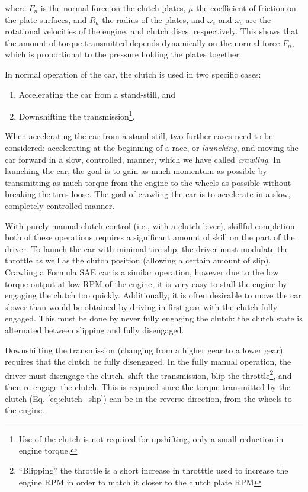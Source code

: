where $F_n$ is the normal force on the clutch plates, $\mu$ the coefficient of friction on the plate surfaces, and $R_a$ the radius of the plates, and $\omega_e$ and $\omega_c$ are the rotational velocities of the engine, and clutch discs, respectively. This shows that the amount of torque transmitted depends dynamically on the normal force $F_n$, which is proportional to the pressure holding the plates together.

In normal operation of the car, the clutch is used in two specific cases:
\begin{enumerate}
  \item Accelerating the car from a stand-still, and
  \item Downshifting the transmission\footnote{Use of the clutch is not required for upshifting, only a small reduction in engine torque.}.
\end{enumerate}

When accelerating the car from a stand-still, two further cases need to be considered: accelerating at the beginning of a race, or \emph{launching}, and moving the car forward in a slow, controlled, manner, which we have called \emph{crawling}. In launching the car, the goal is to gain as much momentum as possible by transmitting as much torque from the engine to the wheels as possible without breaking the tires loose. The goal of crawling the car is to accelerate in a slow, completely controlled manner.

With purely manual clutch control (i.e., with a clutch lever), skillful completion both of these operations requires a significant amount of skill on the part of the driver. To launch the car with minimal tire slip, the driver must modulate the throttle as well as the clutch position (allowing a certain amount of slip). Crawling a Formula SAE car is a similar operation, however due to the low torque output at low RPM of the engine, it is very easy to stall the engine by engaging the clutch too quickly. Additionally, it is often desirable to move the car slower than would be obtained by driving in first gear with the clutch fully engaged. This must be done by never fully engaging the clutch: the clutch state is alternated between slipping and fully disengaged.

Downshifting the transmission (changing from a higher gear to a lower gear) requires that the clutch be fully disengaged. In the fully manual operation, the driver must disengage the clutch, shift the transmission, blip the throttle\footnote{``Blipping'' the throttle is a short increase in throtttle used to increase the engine RPM in order to match it closer to the clutch plate RPM}, and then re-engage the clutch. This is required since the torque transmitted by the clutch (Eq. \ref{eq:clutch_slip}) can be in the reverse direction, from the wheels to the engine.

